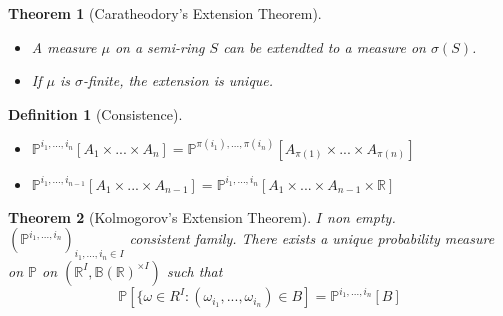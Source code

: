 \documentclass{article}
\newtheorem{theorem}{Theorem}
\newtheorem{definition}{Definition}
\begin{document}
\begin{theorem}[Caratheodory's Extension Theorem]
  \begin{itemize}
  \item A measure $\mu$ on a semi-ring $S$ can be extendted to a
    measure on $\sigma(S)$.
  \item If $\mu$ is $\sigma$-finite, the extension is unique.
  \end{itemize}
\end{theorem}
\begin{definition}[Consistence]
  \begin{itemize}
  \item $\mathbb P^{i_1, ..., i_n}[A_1 \times ... \times A_n] = \mathbb P^{\pi(i_1), ... , \pi(i_n)}[A_{\pi(1)} \times ... \times A_{\pi(n)}]$
  \item $\mathbb P^{i_1, ..., i_{n-1}}[A_1 \times ... \times A_{n-1}] = \mathbb P^{i_1, ..., i_n}[A_1 \times ... \times A_{n-1} \times \mathbb R] $
  \end{itemize}
\end{definition}
\begin{theorem}[Kolmogorov's Extension Theorem]
  $I$ non empty.
  $(\mathbb P^{i_1, ..., i_n})_{i_1, ..., i_n \in I}$ consistent family. There exists a unique probability measure on $\mathbb P$ on $(\mathbb R^I, \mathbb B(\mathbb R)^{\times I})$ such that
  $$\mathbb P[\{ \omega \in R^I: (\omega_{i_1}, ..., \omega_{i_n}) \in B] = \mathbb P^{i_1, ..., i_n}[B]$$
\end{theorem}
\end{document}
